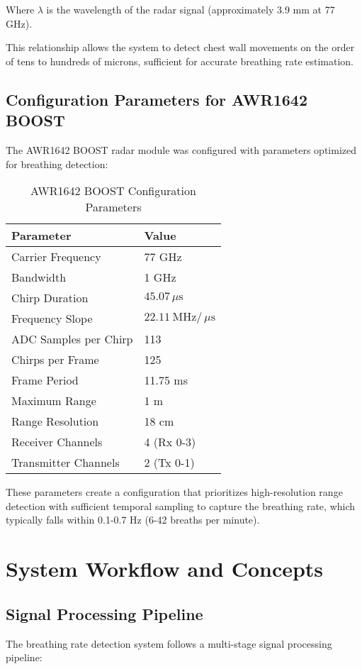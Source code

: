 \documentclass[12pt]{article}
\begin{document}
Where $\lambda$ is the wavelength of the radar signal (approximately 3.9 mm at 77 GHz).

This relationship allows the system to detect chest wall movements on the order of tens to hundreds of microns, sufficient for accurate breathing rate estimation.

\subsection{Configuration Parameters for AWR1642 BOOST}
The AWR1642 BOOST radar module was configured with parameters optimized for breathing detection:

\begin{table}[H]
\centering
\begin{tabular}{|l|l|}
\hline
\textbf{Parameter} & \textbf{Value} \\
\hline
Carrier Frequency & 77 GHz \\
Bandwidth & 1 GHz \\
Chirp Duration & $45.07\,\mu\mathrm{s}$ \\
Frequency Slope & $22.11~\mathrm{MHz}/\,\mu\mathrm{s}$ \\
ADC Samples per Chirp & 113 \\
Chirps per Frame & 125 \\
Frame Period & 11.75 ms \\
Maximum Range & 1 m \\
Range Resolution & 18 cm \\
Receiver Channels & 4 (Rx 0-3) \\
Transmitter Channels & 2 (Tx 0-1) \\
\hline
\end{tabular}
\caption{AWR1642 BOOST Configuration Parameters}
\end{table}

These parameters create a configuration that prioritizes high-resolution range detection with sufficient temporal sampling to capture the breathing rate, which typically falls within 0.1-0.7 Hz (6-42 breaths per minute).

\section{System Workflow and Concepts}

\subsection{Signal Processing Pipeline}
The breathing rate detection system follows a multi-stage signal processing pipeline:
\end{document}
